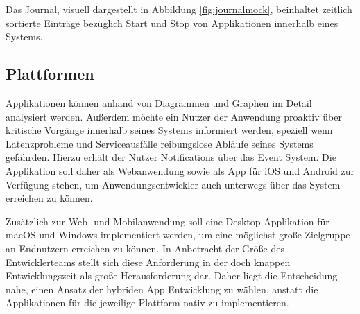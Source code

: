 \noindent
Das Journal, visuell dargestellt in Abbildung \ref{fig:journalmock}, beinhaltet zeitlich sortierte Einträge
bezüglich Start und Stop von Applikationen innerhalb eines Systems.


\newpage

\subsection{Plattformen}

Applikationen können anhand von Diagrammen und Graphen im Detail analysiert werden.
Außerdem möchte ein Nutzer der Anwendung proaktiv über kritische Vorgänge innerhalb seines Systems informiert werden,
speziell wenn Latenzprobleme und Serviceausfälle reibungslose Abläufe seines Systems gefährden.
Hierzu erhält der Nutzer Notifications über das Event System. Die Applikation soll daher als Webanwendung sowie als App für iOS und Android
zur Verfügung stehen, um Anwendungsentwickler auch unterwegs über das System \projectname{} erreichen zu können.

Zusätzlich zur Web- und Mobilanwendung soll eine Desktop-Applikation für macOS und Windows implementiert werden,
um eine möglichst große Zielgruppe an Endnutzern erreichen zu können.
In Anbetracht der Größe des Entwicklerteams stellt sich diese Anforderung in der doch knappen Entwicklungszeit als große Herausforderung dar.
Daher liegt die Entscheidung nahe, einen Ansatz der hybriden App Entwicklung zu wählen, anstatt die Applikationen für die jeweilige Plattform nativ zu implementieren.
